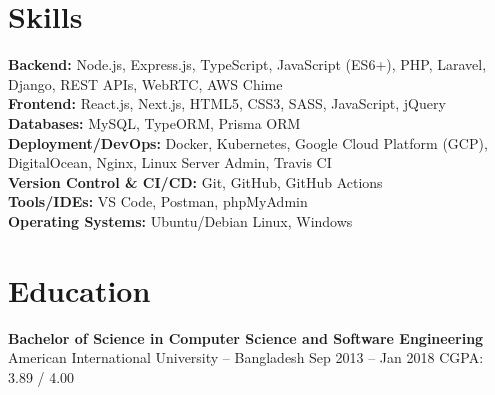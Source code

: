 \documentclass[a4paper,10pt]{article}
\begin{document}
\section*{Skills}
\textbf{Backend:} Node.js, Express.js, TypeScript, JavaScript (ES6+), PHP, Laravel, Django, REST APIs, WebRTC, AWS Chime\\
\textbf{Frontend:} React.js, Next.js, HTML5, CSS3, SASS, JavaScript, jQuery\\
\textbf{Databases:} MySQL, TypeORM, Prisma ORM\\
\textbf{Deployment/DevOps:} Docker, Kubernetes, Google Cloud Platform (GCP), DigitalOcean, Nginx, Linux Server Admin, Travis CI\\
\textbf{Version Control \& CI/CD:} Git, GitHub, GitHub Actions\\
\textbf{Tools/IDEs:} VS Code, Postman, phpMyAdmin\\
\textbf{Operating Systems:} Ubuntu/Debian Linux, Windows

\section*{Education}
\textbf{Bachelor of Science in Computer Science and Software Engineering}\\
American International University -- Bangladesh \hfill Sep 2013 -- Jan 2018 \hspace{1em} CGPA: 3.89 / 4.00
\end{document}
